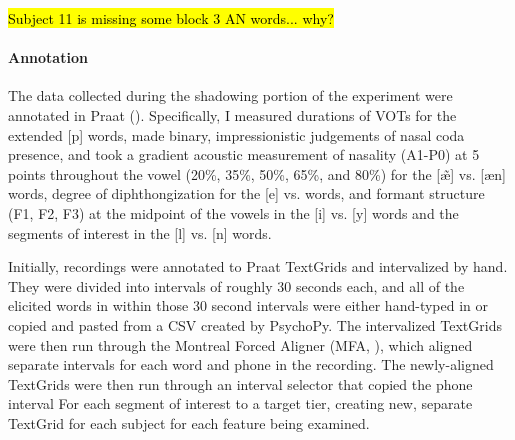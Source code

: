 \hl{Subject 11 is missing some block 3 AN words... why?}

\paragraph{Annotation}
\label{para:shadowingAnnotation}
The data collected during the shadowing portion of the experiment were annotated in Praat (\citep{praat}). Specifically, I measured durations of VOTs for the extended [p] words, made binary, impressionistic judgements of nasal coda presence, and took a gradient acoustic measurement of nasality (A1-P0) at 5 points throughout the vowel (20\%, 35\%, 50\%, 65\%, and 80\%) %
for the [\~{\ae}] vs. [\ae n] words, degree of diphthongization for the [e] vs. \textipa{[iE]} words, and formant structure (F1, F2, F3) at the midpoint of the vowels in the [i] vs. [y] words and the segments of interest in the [l] vs. [n] words.

Initially, recordings were annotated to Praat TextGrids and intervalized by hand. They were divided into intervals of roughly 30 seconds each, and all of the elicited words in within those 30 second intervals were either hand-typed in or copied and pasted from a CSV created by PsychoPy. The intervalized TextGrids were then run through the Montreal Forced Aligner (MFA, \cite{mcauliffe2017montreal}), which aligned separate intervals for each word and phone in the recording. The newly-aligned TextGrids were then run through an interval selector that copied the phone interval For each segment of interest to a target tier, creating new, separate TextGrid for each subject for each feature being examined.

